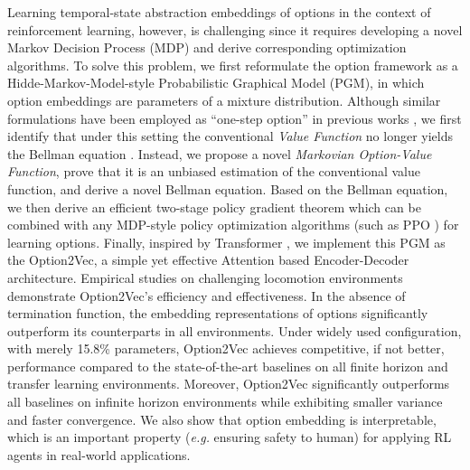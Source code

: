 \documentclass{article}
\begin{document}
Learning temporal-state abstraction embeddings of options in the
context of reinforcement learning, however, is challenging since
it requires developing a novel Markov Decision Process (MDP) and
derive corresponding optimization algorithms. To solve this
problem, we first reformulate the option framework as a
Hidde-Markov-Model-style \cite{bishop2006pattern} Probabilistic
Graphical Model (PGM), in which option embeddings are parameters
of a mixture distribution. Although similar formulations have
been employed as ``one-step option'' in previous works
\cite{henderson2018optiongan,sharma2018directed,shankar2020learning,lee2020learning,zhang2019dac},
we first identify that under this setting the conventional
\emph{Value Function} no longer yields the Bellman equation
\cite{sutton2018reinforcement}. Instead, we propose a novel
\emph{Markovian Option-Value Function}, prove that it is an
unbiased estimation of the conventional value function, and derive a
novel Bellman equation. Based on the Bellman equation, we then
derive an efficient two-stage policy gradient theorem
\cite{sutton2018reinforcement} which can be combined with any
MDP-style \cite{zhang2019dac} policy optimization algorithms
(such as PPO \cite{witoonchart2017application}) for learning
options. Finally, inspired by Transformer
\cite{vaswani2017attention}, we implement this PGM as the
Option2Vec, a simple yet effective Attention based
Encoder-Decoder architecture. Empirical studies on challenging
locomotion environments demonstrate Option2Vec's efficiency and
effectiveness. In the absence of termination function, the
embedding representations of options significantly outperform its
counterparts in all environments. Under
  widely used configuration, with merely 15.8\% parameters,
  Option2Vec achieves competitive, if not better, performance compared to the state-of-the-art
  baselines on all finite horizon and transfer learning
  environments. Moreover, Option2Vec significantly
outperforms all baselines on infinite horizon environments while
exhibiting smaller variance and faster convergence. We also show
that option embedding is interpretable, which is an important property
(\textit{e.g.} ensuring safety to human) for applying RL agents in
real-world applications.

\end{document}
